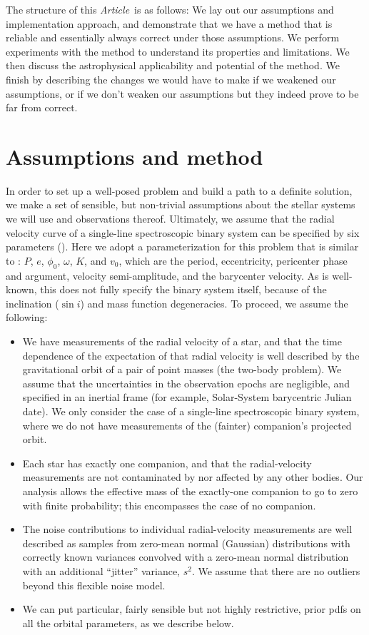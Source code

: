 \documentclass[manuscript, letterpaper]{aastex6}
\newcommand{\documentname}{\textsl{Article}}
\newcommand{\resp}[1]{#1}
\begin{document}
The structure of this \documentname\ is as follows:
We lay out our assumptions and implementation approach, and demonstrate that we
have a method that is reliable and essentially always correct under
those assumptions.
We perform experiments with the method to understand its properties and
limitations.
We then discuss the astrophysical applicability and potential of the
method.
We finish by describing the changes we would have to make if we weakened our assumptions, or
if we don't weaken our assumptions but they indeed prove to be far from correct.

\section{Assumptions and method} \label{sec:method}

In order to set up a well-posed problem and build a path to a definite solution,
we make a set of sensible, but non-trivial assumptions about the stellar systems we will use
and observations thereof.
Ultimately, we assume that the radial velocity curve of a single-line
spectroscopic binary system can be specified by six parameters
(\citealt{Kepler:1609}).
Here we adopt a parameterization for this problem that is similar to
\citealt{Murray:2010}:
$P$, $e$, $\phi_0$, $\omega$, $K$, and $v_0$, which are the period,
eccentricity, pericenter phase and argument, velocity semi-amplitude, and the
barycenter velocity.
As is well-known, this does not fully specify the binary system itself, because
of the inclination ($\sin{i}$) and mass function degeneracies.
To proceed, we assume the following:
\begin{itemize}\itemsep0ex  %
\item We have measurements of the radial velocity of a
  star, and that the time dependence of the expectation of that radial
  velocity is well described by the gravitational orbit of a pair of
  point masses (the two-body problem). We assume that the uncertainties
  in the observation epochs are negligible, and specified in an inertial frame (for
  example, Solar-System barycentric Julian date).
  We only consider the case of a single-line spectroscopic binary system,
  where we do not have measurements of the (fainter) companion's projected orbit.
\item  Each star has exactly one companion, and that the radial-velocity
  measurements are not contaminated by nor affected by any other bodies. Our
  analysis allows the effective mass of the exactly-one companion to go to zero
  \resp{with finite probability}; this encompasses the case of no companion.
\item The noise contributions to individual radial-velocity measurements are
  well described as \resp{samples} from zero-mean normal (Gaussian)
  distributions with correctly known variances convolved with a zero-mean normal
  distribution with an additional ``jitter'' variance, $s^2$. We assume that
  there are no outliers beyond this flexible noise model.
\item We can put particular, fairly sensible but not highly restrictive,
  prior pdfs on all the orbital parameters, as we
  describe below.
\end{itemize}
\end{document}
